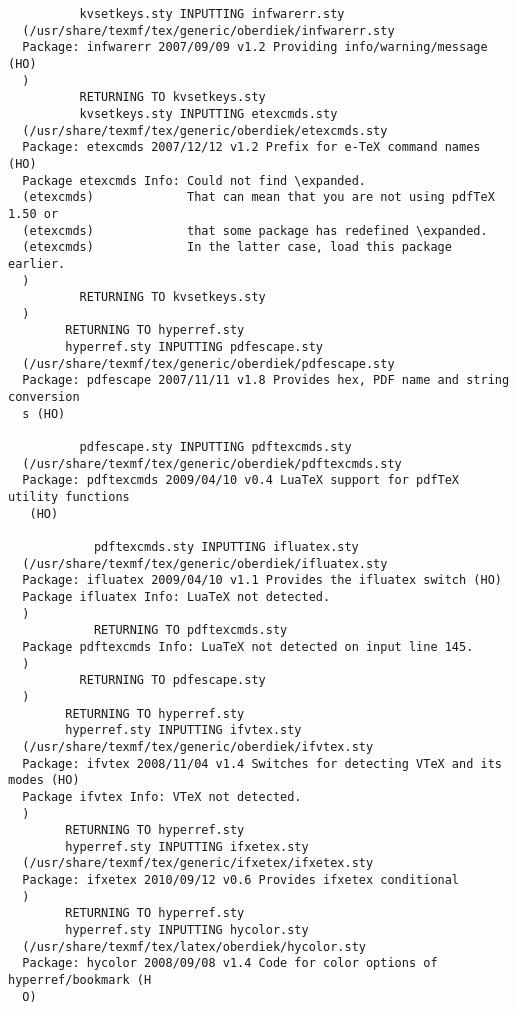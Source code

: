 \documentclass[fleqn]{article}%
\begin{document}
\begin{verbatim}
          kvsetkeys.sty INPUTTING infwarerr.sty 
  (/usr/share/texmf/tex/generic/oberdiek/infwarerr.sty
  Package: infwarerr 2007/09/09 v1.2 Providing info/warning/message (HO)
  )
          RETURNING TO kvsetkeys.sty 
          kvsetkeys.sty INPUTTING etexcmds.sty 
  (/usr/share/texmf/tex/generic/oberdiek/etexcmds.sty
  Package: etexcmds 2007/12/12 v1.2 Prefix for e-TeX command names (HO)
  Package etexcmds Info: Could not find \expanded.
  (etexcmds)             That can mean that you are not using pdfTeX 1.50 or
  (etexcmds)             that some package has redefined \expanded.
  (etexcmds)             In the latter case, load this package earlier.
  )
          RETURNING TO kvsetkeys.sty 
  )
        RETURNING TO hyperref.sty 
        hyperref.sty INPUTTING pdfescape.sty 
  (/usr/share/texmf/tex/generic/oberdiek/pdfescape.sty
  Package: pdfescape 2007/11/11 v1.8 Provides hex, PDF name and string conversion
  s (HO)
  
          pdfescape.sty INPUTTING pdftexcmds.sty 
  (/usr/share/texmf/tex/generic/oberdiek/pdftexcmds.sty
  Package: pdftexcmds 2009/04/10 v0.4 LuaTeX support for pdfTeX utility functions
   (HO)
  
            pdftexcmds.sty INPUTTING ifluatex.sty 
  (/usr/share/texmf/tex/generic/oberdiek/ifluatex.sty
  Package: ifluatex 2009/04/10 v1.1 Provides the ifluatex switch (HO)
  Package ifluatex Info: LuaTeX not detected.
  )
            RETURNING TO pdftexcmds.sty 
  Package pdftexcmds Info: LuaTeX not detected on input line 145.
  )
          RETURNING TO pdfescape.sty 
  )
        RETURNING TO hyperref.sty 
        hyperref.sty INPUTTING ifvtex.sty 
  (/usr/share/texmf/tex/generic/oberdiek/ifvtex.sty
  Package: ifvtex 2008/11/04 v1.4 Switches for detecting VTeX and its modes (HO)
  Package ifvtex Info: VTeX not detected.
  )
        RETURNING TO hyperref.sty 
        hyperref.sty INPUTTING ifxetex.sty 
  (/usr/share/texmf/tex/generic/ifxetex/ifxetex.sty
  Package: ifxetex 2010/09/12 v0.6 Provides ifxetex conditional
  )
        RETURNING TO hyperref.sty 
        hyperref.sty INPUTTING hycolor.sty 
  (/usr/share/texmf/tex/latex/oberdiek/hycolor.sty
  Package: hycolor 2008/09/08 v1.4 Code for color options of hyperref/bookmark (H
  O)
  

\end{verbatim}
\end{document}
